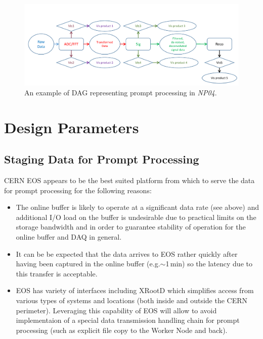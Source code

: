 \documentclass[pdftex,12pt,letter]{article}
\newcommand{\xrd}{XRootD\xspace}
\newcommand{\expname}{\textit{NP04}\xspace}
\begin{document}
\begin{figure}[tbh]
  \centering
  \includegraphics[width=1.0\textwidth]{figures/prompt_dag_2.pdf}
  \caption{An example of DAG representing prompt processing in \expname.}
  \label{fig:dag1}
\end{figure}


\section{Design Parameters}
\label{sec:parameters}
\subsection{Staging Data for Prompt Processing}
CERN EOS appears to be the best suited platform from which to
serve the data for prompt processing for the following reasons:
\begin{itemize}

\item The online buffer is likely to operate at a significant data rate (see above) and additional I/O load on the buffer is undesirable
due to practical limits on the storage bandwidth and in order to guarantee stability of operation for the online buffer and DAQ in general.

\item It can be be expected that the data arrives to EOS rather quickly after having been captured in the online buffer (e.g.$\sim$1\,min) so
the latency due to this transfer is acceptable.

\item EOS has variety of interfaces including \xrd \cite{xrootd} which simplifies access from various types of
systems and  locations (both inside and outside the CERN perimeter).
Leveraging this capability of EOS will allow to avoid implementaion of a special data transmission handling
chain for prompt processing (such as explicit file copy to the Worker Node and back).


\end{itemize}
\end{document}
